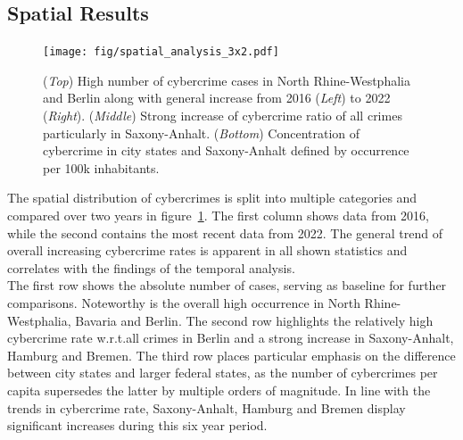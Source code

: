 \documentclass{article}
\theoremstyle{plain}
\theoremstyle{definition}
\theoremstyle{remark}
\begin{document}
\subsection{Spatial Results}
\label{spatial_results}
%
\begin{figure}[!h]
    \texttt{[image: fig/spatial\_analysis\_3x2.pdf]}
    \caption{(\textit{Top}) High number of cybercrime cases in North Rhine-Westphalia and Berlin along with general increase from 2016 (\textit{Left}) to 2022 (\textit{Right}). (\textit{Middle}) Strong increase of cybercrime ratio of all crimes particularly in Saxony-Anhalt. (\textit{Bottom}) Concentration of cybercrime in city states and Saxony-Anhalt defined by occurrence per 100k inhabitants.}
    \label{spatial_plot}
\end{figure}
%
The spatial distribution of cybercrimes is split into multiple categories and compared over two years in figure~\ref{spatial_plot}.
The first column shows data from 2016, while the second contains the most recent data from 2022. The general trend of overall increasing cybercrime rates is apparent in all shown statistics and correlates with the findings of the temporal analysis.\\
The first row shows the absolute number of cases, serving as baseline for further comparisons. Noteworthy is the overall high occurrence in North Rhine-Westphalia, Bavaria and Berlin. The second row highlights the relatively high cybercrime rate w.r.t.\@ all crimes in Berlin and a strong increase in Saxony-Anhalt, Hamburg and Bremen. The third row places particular emphasis on the difference between city states and larger federal states, as the number of cybercrimes per capita supersedes the latter by multiple orders of magnitude. In line with the trends in cybercrime rate, Saxony-Anhalt, Hamburg and Bremen display significant increases during this six year period.
\end{document}
